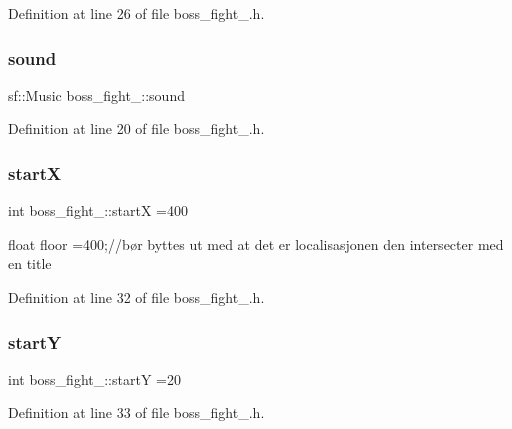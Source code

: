Definition at line 26 of file boss\+\_\+fight\+\_.\+h.

\hypertarget{classboss__fight__1_a7256c118906cf857f86beeb667291a91}{}\label{classboss__fight__1_a7256c118906cf857f86beeb667291a91} 
\subsubsection{\texorpdfstring{sound}{sound}}
{\footnotesize\ttfamily sf\+::\+Music boss\+\_\+fight\+\_\+::sound}



Definition at line 20 of file boss\+\_\+fight\+\_.\+h.

\hypertarget{classboss__fight__1_af45fe739248b1b3da432ec4ab0770913}{}\label{classboss__fight__1_af45fe739248b1b3da432ec4ab0770913} 
\subsubsection{\texorpdfstring{startX}{startX}}
{\footnotesize\ttfamily int boss\+\_\+fight\+\_\+::startX =400}



float floor =400;//bør byttes ut med at det er localisasjonen den intersecter med en title 



Definition at line 32 of file boss\+\_\+fight\+\_.\+h.

\hypertarget{classboss__fight__1_a71884d8bccccd003e7b53acc6b86d513}{}\label{classboss__fight__1_a71884d8bccccd003e7b53acc6b86d513} 
\subsubsection{\texorpdfstring{startY}{startY}}
{\footnotesize\ttfamily int boss\+\_\+fight\+\_\+::startY =20}



Definition at line 33 of file boss\+\_\+fight\+\_.\+h.

\hypertarget{classboss__fight__1_a87a27b1265ff58f25c6074405c93487e}{}\label{classboss__fight__1_a87a27b1265ff58f25c6074405c93487e} 
